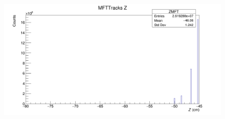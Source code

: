 \documentclass[11pt]{beamer}
\begin{document}
\begin{frame}
\begin{columns}[c]
\begin{column}{0.5\textwidth}
\begin{figure}
\begin{center}
                \end{center}
            \end{figure}
            \begin{figure}
                \begin{center}
                    \includegraphics[width=\textwidth]{Plots/MFT_pass3/Z_MFT.png}
                \end{center}
            \end{figure}
        \end{column}
    \end{columns}

\end{frame}
\end{document}

